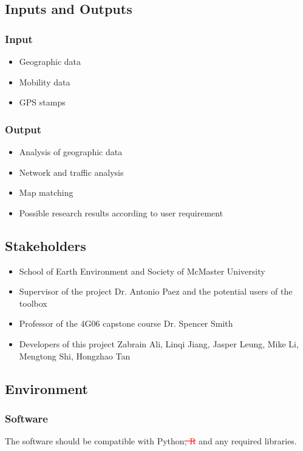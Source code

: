 \documentclass{article}
\begin{document}
\subsection{Inputs and Outputs}
    \subsubsection{Input}
    \begin{itemize}
    \item Geographic data
    \item Mobility data
    \item GPS stamps
    \end{itemize}
    \subsubsection{Output}
    \begin{itemize}
    \item Analysis of geographic data
    \item Network and traffic analysis
    \item Map matching
    \item Possible research results according to user requirement
    \end{itemize}

\subsection{Stakeholders}

\begin{itemize}
    \item School of Earth Environment and Society of McMaster University
    \item Supervisor of the project Dr. Antonio Paez and the potential users of the toolbox
    \item Professor of the 4G06 capstone course Dr. Spencer Smith
    \item Developers of this project Zabrain Ali, Linqi Jiang, Jasper Leung, Mike Li,  Mengtong Shi, Hongzhao Tan
\end{itemize}

\subsection{Environment}
    \subsubsection{Software}
    The software should be compatible with Python\textcolor{red}{\sout{, R}} and any required libraries.
    
\end{document}
